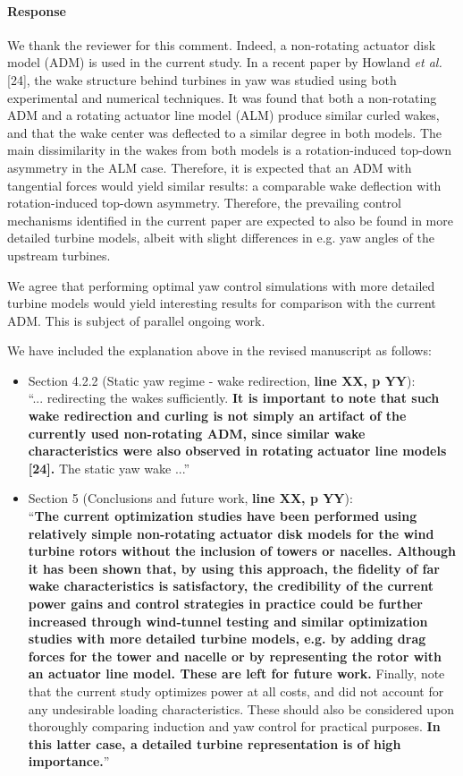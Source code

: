 \documentclass[]{article}
\newcommand{\red}[1]{\textbf{\color{red} #1}}
\newcommand{\revision}[1]{\textbf{#1}}
\begin{document}
\paragraph{Response} We thank the reviewer for this comment. Indeed, a non-rotating actuator disk model (ADM) is used in the current study. In a recent paper by Howland \emph{et al.} [24], the wake structure behind turbines in yaw was studied using both experimental and numerical techniques. It was found that both a non-rotating ADM and a rotating actuator line model (ALM) produce similar curled wakes, and that the wake center was deflected to a similar degree in both models. The main dissimilarity in the wakes from both models is a rotation-induced top-down asymmetry in the ALM case. Therefore, it is expected that an ADM with tangential forces would yield similar results: a comparable wake deflection with rotation-induced top-down asymmetry. Therefore, the prevailing control mechanisms identified in the current paper are expected to also be found in more detailed turbine models, albeit with slight differences in e.g. yaw angles of the upstream turbines.

We agree that performing optimal yaw control simulations with more detailed turbine models would yield interesting results for comparison with the current ADM. This is subject of parallel ongoing work. 

We have included the explanation above in the revised manuscript as follows:
\begin{itemize}
	\item Section 4.2.2 (Static yaw regime - wake redirection, \red{line XX, p YY}): \\``... redirecting the wakes sufficiently. \revision{It is important to note that such wake redirection and curling is not simply an artifact of the currently used non-rotating ADM, since similar wake characteristics were also observed in rotating actuator line models [24].} The static yaw wake ...''
	\item Section 5 (Conclusions and future work, \red{line XX, p YY}): \\``\revision{The current optimization studies have been performed using relatively simple non-rotating actuator disk models for the wind turbine rotors without the inclusion of towers or nacelles. Although it has been shown that, by using this approach, the fidelity of far wake characteristics is satisfactory, the credibility of the current power gains and control strategies in practice could be further increased through wind-tunnel testing and similar optimization studies with more detailed turbine models, e.g. by adding drag forces for the tower and nacelle or by representing the rotor with an actuator line model. These are left for future work.} Finally, note that the current study optimizes power at all costs, and did not account for any undesirable loading characteristics. These should also be considered upon thoroughly comparing induction and yaw control for practical purposes. \revision{In this latter case, a detailed turbine representation is of high importance.}''
\end{itemize}
\end{document}
